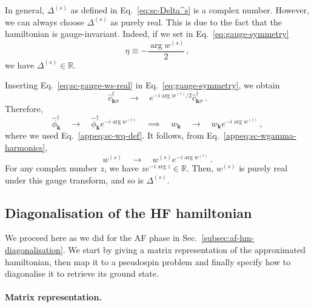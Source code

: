 In general, $\Delta^{(s)}$ as defined in Eq.~\eqref{eq:sc-Delta^s} is a complex number. However, we can always choose $\Delta^{(s)}$ as purely real. This is due to the fact that the hamiltonian is gauge-invariant. Indeed, if we set in Eq.~\eqref{eq:gauge-symmetry}
\begin{equation}\label{eq:sc-gauge-ws-real}
	\eta \equiv -\frac{\arg w^{(s)}}{2} \, ,
\end{equation}
we have $\Delta^{(s)} \in \mathbb{R}$.

\begin{tabproof}
	Inserting Eq.~\eqref{eq:sc-gauge-ws-real} in Eq.~\eqref{eq:gauge-symmetry}, we obtain
	\[
	\hat c_{\mathbf{k}\sigma}^\dagger 
	\quad\to\quad 
	e^{- i\arg w^{(s)}/2} \hat c_{\mathbf{k}\sigma}^\dagger \, .
	\]
	Therefore,
	\[
	\hat \phi_\mathbf{k}^\dagger
	\quad\to\quad 
	\hat \phi_\mathbf{k}^\dagger e^{- i\arg w^{(s)}} 
	\quad\implies\quad
	w_\mathbf{k}
	\quad\to\quad 
	w_\mathbf{k} e^{- i\arg w^{(s)}} 
	\, ,
	\]
	where we used Eq.~\eqref{appeq:sc-wq-def}. It follows, from Eq.~\eqref{appeq:sc-wgamma-harmonics},
	\[
	w^{(s)} \quad\to\quad w^{(s)} e^{- i\arg w^{(s)}} \, .
	\]
	For any complex number $z$, we have $z e^{-i \arg z} \in \mathbb{R}$. Then, $w^{(s)}$ is purely real under this gauge transform, and so is $\Delta^{(s)}$.
\end{tabproof}

\subsection{Diagonalisation of the HF hamiltonian}\label{subsec:sc-hm-diagonalisation}

We proceed here as we did for the AF phase in Sec.~\ref{subsec:af-hm-diagonalisation}. We start by giving a matrix representation of the approximated hamiltonian, then map it to a pseudospin problem and finally specify how to diagonalise it to retrieve its ground state.

\paragraph{Matrix representation.}

